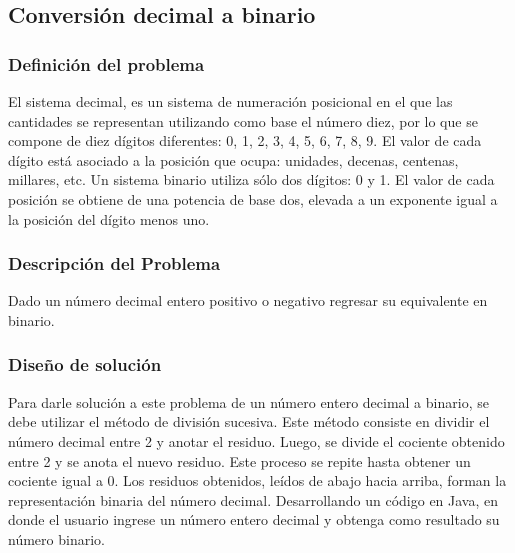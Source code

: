 \subsection{Conversión decimal a binario}

\subsubsection{Definición del problema}
El sistema decimal, es un sistema de numeración posicional en el que las cantidades se representan utilizando como base el número diez, por lo que se compone de diez dígitos diferentes: 0, 1, 2, 3, 4, 5, 6, 7, 8, 9.
El valor de cada dígito está asociado a la posición que ocupa: unidades, decenas, centenas, millares, etc. 
Un sistema binario utiliza sólo dos dígitos: 0 y 1. El valor de cada posición se obtiene de una potencia de base dos, elevada a un exponente igual a la posición del dígito menos uno.\cite{SistemaDecimal}\\
\subsubsection{Descripción del Problema}
Dado un número decimal entero positivo o negativo regresar su equivalente en binario.
\subsubsection{Diseño de solución}
Para darle solución a este problema de un número entero decimal a binario, se debe utilizar el método de división sucesiva. Este método consiste en dividir el número decimal entre 2 y anotar el residuo. Luego, se divide el cociente obtenido entre 2 y se anota el nuevo residuo. Este proceso se repite hasta obtener un cociente igual a 0. Los residuos obtenidos, leídos de abajo hacia arriba, forman la representación binaria del número decimal. Desarrollando un código en Java, en donde el usuario ingrese un número entero decimal y obtenga como resultado su número binario.
